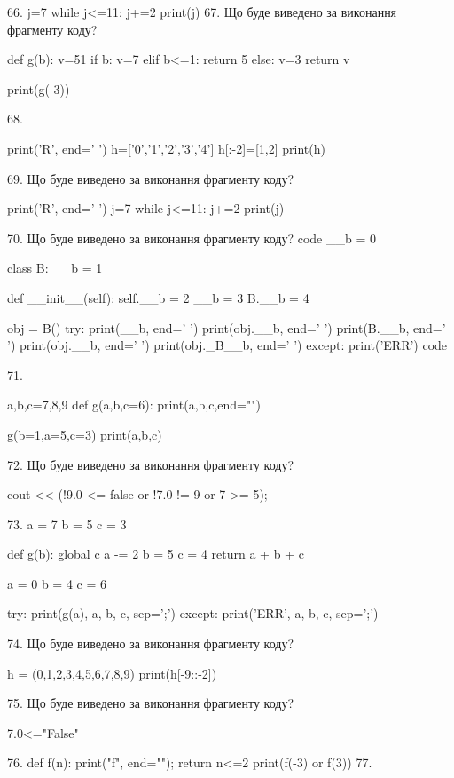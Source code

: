 \documentclass[11pt]{article}
\begin{document}
66. 
j=7
   while j<=11: j+=2
   print(j)
67. Що буде виведено за виконання фрагменту коду?

def g(b):
    v=51
    if b: 
        v=7
    elif b<=1:
         return 5
    else:
         v=3
    return v

print(g(-3))

68. 

print('R', end=' ')
h=['0','1','2','3','4']
h[:-2]=[1,2]
print(h)


69. Що буде виведено за виконання фрагменту коду?

print('R', end=' ')
j=7
while j<=11:
    j+=2
print(j)


70. Що буде виведено за виконання фрагменту коду?
code
__b = 0

class B:
    __b = 1
    
    def __init__(self):
        self.__b = 2
        __b = 3
        B.__b = 4

obj = B()
try:
    print(__b, end=' ')
    print(obj.__b, end=' ')
    print(B.__b, end=' ')
    print(obj.__b, end=' ')
    print(obj._B__b, end=' ')
except:
    print('ERR')
code

71. 

a,b,c=7,8,9
def g(a,b,c=6):
    print(a,b,c,end="")

g(b=1,a=5,c=3)
print(a,b,c)


72. Що буде виведено за виконання фрагменту коду?

cout << (!9.0 <= false or !7.0 != 9 or 7 >= 5);

73. 
a = 7
b = 5
c = 3

def g(b):
global c    a -= 2
    b = 5
    c = 4
    return a + b + c

a = 0
b = 4
c = 6

try:
    print(g(a), a, b, c, sep=';')
except:
    print('ERR', a, b, c, sep=';')

74. Що буде виведено за виконання фрагменту коду?

h = (0,1,2,3,4,5,6,7,8,9)
print(h[-9::-2])


75. Що буде виведено за виконання фрагменту коду?

7.0<="False"

76. 
def f(n): print("f", end=""); return n<=2
   print(f(-3) or f(3))
77. 
\end{document}
